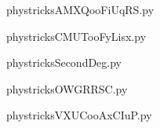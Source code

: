    

    \clearpage
    


    \newcommand{\CaptionFigAMXQooFiUqRS}{<+Type your caption here+>}
    \begin{center}
        
    \end{center}
    phystricksAMXQooFiUqRS.py

    

    \clearpage
    


    \newcommand{\CaptionFigCMUTooFyLisx}{<+Type your caption here+>}
    \begin{center}
        
    \end{center}
    phystricksCMUTooFyLisx.py

    

    \clearpage
    


    \newcommand{\CaptionFigSecondDeg}{<+Type your caption here+>}
    \begin{center}
        
    \end{center}
    phystricksSecondDeg.py

    

    \clearpage
    


    \newcommand{\CaptionFigOWGRRSC}{<+Type your caption here+>}
    \begin{center}
        
    \end{center}
    phystricksOWGRRSC.py

    

    \clearpage
    


    \newcommand{\CaptionFigVXUCooAxCIuP}{<+Type your caption here+>}
    \begin{center}
        
    \end{center}
    phystricksVXUCooAxCIuP.py

    

    \clearpage
    


